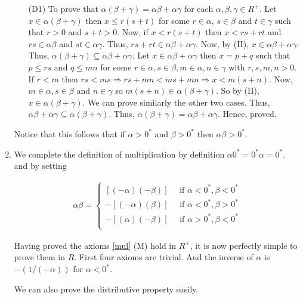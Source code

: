 \begin{enumerate}[{\bf Step 1.}]
\begin{enumerate}[(M1)]
	\item[(D1)] To prove that $\alpha ( \beta + \gamma ) = \alpha \beta + \alpha \gamma $ for each $\alpha , \beta , \gamma \in R^+$.
	\bigbreak \quad
	Let $x \in \alpha(\beta + \gamma)$ then $x \leq r(s+t)$ for some $r \in \alpha$, $s \in \beta$ and $t \in \gamma$ such that $r > 0$ and $s + t > 0$.
	Now, if $x < r(s+t)$ then $x < rs + rt$ and $rs \in \alpha \beta$ and $st \in \alpha \gamma$.
	Thus, $rs + rt \in \alpha \beta + \alpha \gamma$. Now, by (II), $x \in \alpha \beta + \alpha \gamma$.
	Thus, $\alpha(\beta + \gamma) \subseteq \alpha \beta + \alpha \gamma$.
	\bigbreak \quad
	Let $x \in \alpha \beta + \alpha \gamma$ then $x = p + q$ such that $p \leq rs$ and $q \leq mn$
	for some $r \in \alpha, s \in \beta, m \in \alpha, n \in \gamma$ with $r, s, m, n > 0$.
	\bigbreak \quad
	If $r < m$ then $rs < ms \Rightarrow rs + mn < ms + mn \Rightarrow x < m(s + n)$.
	Now, $m \in \alpha, s \in \beta$ and $n \in \gamma$ so $m(s+n) \in \alpha(\beta + \gamma)$.
	So by (II), $x \in \alpha(\beta + \gamma)$.
	We can prove similarly the other two cases.
	Thus, $\alpha \beta + \alpha \gamma \subseteq \alpha ( \beta + \gamma )$.
	\bigbreak \quad
	Thus, $\alpha (\beta + \gamma) = \alpha \beta + \alpha \gamma$. Hence, proved.
\end{enumerate}

Notice that this follows that if $\alpha > 0^*$ and $\beta > 0^*$ then $\alpha \beta > 0^*$.

\pagebreak

\item We complete the definition of multiplication by definition $\alpha 0^* = 0^* \alpha = 0^*$.
and by setting

\begin{gather*}
	\alpha \beta =
	\begin{cases}
		[(-\alpha)(-\beta)] \quad \text{ if } \alpha < 0^*, \beta < 0^* \\
		-[(-\alpha)(\beta)] \quad \text{ if } \alpha < 0^*, \beta > 0^* \\
		-[(\alpha)(-\beta)] \quad \text{ if } \alpha > 0^*, \beta < 0^* \\
	\end{cases}
\end{gather*}

Having proved the axioms \ref{mul} (M) hold in $R^+$, it is now perfectly simple to prove them in $R$.
First four axioms are trivial. And the inverse of $\alpha$ is $-(1/(-\alpha))$ for $\alpha < 0^*$.

We can also prove the distributive property easily.


\end{enumerate}
